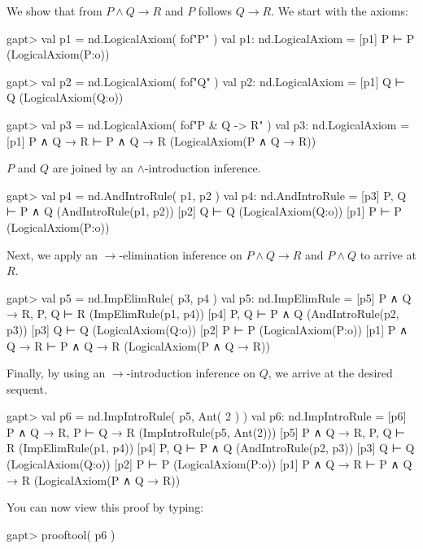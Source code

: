 \documentclass[a4paper,11pt]{book}
\newcommand{\impl}{\to} %
\renewcommand{\land}{\wedge}
\begin{document}
We show that from $P \land Q \impl R$ and $P$ follows $Q \impl R$. We start with
the axioms:

\begin{clilisting}
gapt> val p1 = nd.LogicalAxiom( fof"P" )
val p1: nd.LogicalAxiom = [p1] P ⊢ P    (LogicalAxiom(P:o))

gapt> val p2 = nd.LogicalAxiom( fof"Q" )
val p2: nd.LogicalAxiom = [p1] Q ⊢ Q    (LogicalAxiom(Q:o))

gapt> val p3 = nd.LogicalAxiom( fof"P & Q -> R" )
val p3: nd.LogicalAxiom = [p1] P ∧ Q → R ⊢ P ∧ Q → R    (LogicalAxiom(P ∧ Q → R))

\end{clilisting}

$P$ and $Q$ are joined by an $\land$-introduction inference.

\begin{clilisting}
gapt> val p4 = nd.AndIntroRule( p1, p2 )
val p4: nd.AndIntroRule = [p3] P, Q ⊢ P ∧ Q    (AndIntroRule(p1, p2))
[p2] Q ⊢ Q    (LogicalAxiom(Q:o))
[p1] P ⊢ P    (LogicalAxiom(P:o))

\end{clilisting}

Next, we apply an $\impl$-elimination inference on $P \land Q \impl R$
and $P \land Q$ to arrive at $R$.

\begin{clilisting}
gapt> val p5 = nd.ImpElimRule( p3, p4 )
val p5: nd.ImpElimRule = [p5] P ∧ Q → R, P, Q ⊢ R    (ImpElimRule(p1, p4))
[p4] P, Q ⊢ P ∧ Q    (AndIntroRule(p2, p3))
[p3] Q ⊢ Q    (LogicalAxiom(Q:o))
[p2] P ⊢ P    (LogicalAxiom(P:o))
[p1] P ∧ Q → R ⊢ P ∧ Q → R    (LogicalAxiom(P ∧ Q → R))

\end{clilisting}

Finally, by using an $\impl$-introduction inference on $Q$, we arrive
at the desired sequent.

\begin{clilisting}
gapt> val p6 = nd.ImpIntroRule( p5, Ant( 2 ) )
val p6: nd.ImpIntroRule = [p6] P ∧ Q → R, P ⊢ Q → R    (ImpIntroRule(p5, Ant(2)))
[p5] P ∧ Q → R, P, Q ⊢ R    (ImpElimRule(p1, p4))
[p4] P, Q ⊢ P ∧ Q    (AndIntroRule(p2, p3))
[p3] Q ⊢ Q    (LogicalAxiom(Q:o))
[p2] P ⊢ P    (LogicalAxiom(P:o))
[p1] P ∧ Q → R ⊢ P ∧ Q → R    (LogicalAxiom(P ∧ Q → R))

\end{clilisting}

You can now view this proof by typing:
\begin{clilisting}
gapt> prooftool( p6 )

\end{clilisting}
\end{document}
